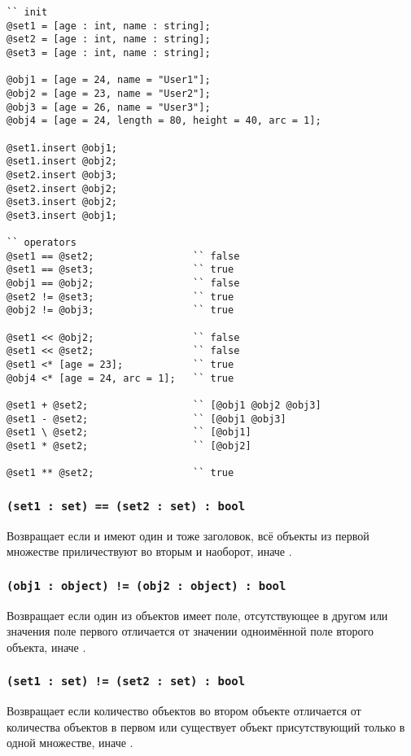 \begin{lstlisting}[caption=Примеры использования операторов над данными типа object и set, label=setobjopex]
`` init
@set1 = [age : int, name : string];
@set2 = [age : int, name : string];
@set3 = [age : int, name : string];

@obj1 = [age = 24, name = "User1"];
@obj2 = [age = 23, name = "User2"];
@obj3 = [age = 26, name = "User3"];
@obj4 = [age = 24, length = 80, height = 40, arc = 1];

@set1.insert @obj1;
@set1.insert @obj2;
@set2.insert @obj3;
@set2.insert @obj2;
@set3.insert @obj2;
@set3.insert @obj1;

`` operators
@set1 == @set2;					`` false
@set1 == @set3;					`` true
@obj1 == @obj2;					`` false
@set2 != @set3;					`` true
@obj2 != @obj3;					`` true

@set1 << @obj2;					`` false
@set1 << @set2;					`` false
@set1 <* [age = 23];			`` true
@obj4 <* [age = 24, arc = 1];	`` true

@set1 + @set2;					`` [@obj1 @obj2 @obj3]
@set1 - @set2;					`` [@obj1 @obj3]
@set1 \ @set2;					`` [@obj1]
@set1 * @set2;					`` [@obj2]

@set1 ** @set2;					`` true
\end{lstlisting}

\subsubsection{\lstinline`(set1 : set) == (set2 : set) : bool`}

Возвращает \true{} если  и  имеют один и тоже заголовок, всё объекты из первой множестве приличествуют во вторым и наоборот, иначе \false{}.

\subsubsection{\lstinline`(obj1 : object) != (obj2 : object) : bool`}

Возвращает \true{} если один из объектов имеет поле, отсутствующее в другом или значения поле первого отличается от значении одноимённой поле второго объекта, иначе \false{}.

\subsubsection{\lstinline`(set1 : set) != (set2 : set) : bool`}

Возвращает \true{} если количество объектов во втором объекте отличается от количества объектов в первом или существует объект присутствующий только в одной множестве, иначе \false{}.

